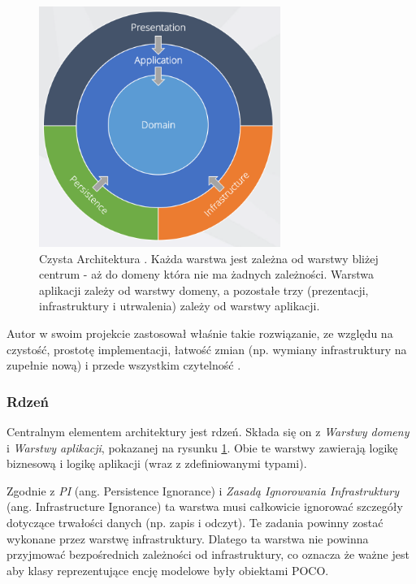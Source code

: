 \documentclass[12pt]{article}
\numberwithin{figure}{section}
\begin{document}
\begin{sloppypar}
\begin{figure}[H] 
    \centering
    \includegraphics[width=0.7\textwidth]{images/chapter_3/clean-architecture.png}
    \caption{Czysta Architektura \cite{clean-architecture}. Każda warstwa jest zależna od warstwy bliżej centrum - aż do domeny która nie ma żadnych zależności. Warstwa aplikacji zależy od warstwy domeny, a pozostałe trzy (prezentacji, infrastruktury i utrwalenia) zależy od warstwy aplikacji.}
    \label{fig:clean-architecture}
\end{figure}
    
Autor w swoim projekcie zastosował właśnie takie rozwiązanie, ze względu na czystość, prostotę implementacji, łatwość zmian (np. wymiany infrastruktury na zupełnie nową) i przede wszystkim czytelność \cite{clean-architecture}. 

    \subsubsection{Rdzeń} \label{core}
    Centralnym elementem architektury jest rdzeń. Składa się on z \textit{Warstwy domeny} i \textit{Warstwy aplikacji}, pokazanej na rysunku \ref{fig:clean-architecture}. Obie te warstwy zawierają logikę biznesową i logikę aplikacji (wraz z zdefiniowanymi typami). 
        
    Zgodnie z \textit{PI} (ang. Persistence Ignorance) i \textit{Zasadą Ignorowania Infrastruktury} (ang.  Infrastructure Ignorance) ta warstwa musi całkowicie ignorować szczegóły dotyczące trwałości danych (np. zapis i odczyt). Te zadania powinny zostać wykonane przez warstwę infrastruktury. Dlatego ta warstwa nie powinna przyjmować bezpośrednich zależności od infrastruktury, co oznacza że ważne jest aby klasy reprezentujące encję modelowe były obiektami POCO.
        

\end{sloppypar}
\end{document}
